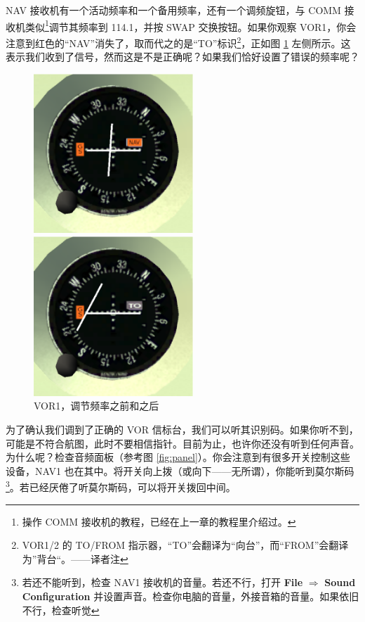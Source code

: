 NAV 接收机有一个活动频率和一个备用频率，还有一个调频旋钮，与 COMM 接收机类似\footnote{操作 COMM 接收机的教程，已经在上一章的教程里介绍过。}调节其频率到 114.1，并按 SWAP 交换按钮。如果你观察 VOR1，你会注意到红色的“NAV”消失了，取而代之的是“TO”标识\footnote{VOR1/2 的 TO/FROM 指示器，“TO”会翻译为“向台”，而“FROM”会翻译为”背台“。——译者注}，正如图 \ref{fig:VOR1} 左侧所示。这表示我们收到了信号，然而这是不是正确呢？如果我们恰好设置了错误的频率呢？

\begin{figure}
  \begin{minipage}[b]{0.5\linewidth}
    \includegraphics[width=6cm]{img/VOR1_before}
  \end{minipage}
  \hspace{0.5cm}
  \begin{minipage}[b]{0.5\linewidth}
    \includegraphics[width=6cm]{img/VOR1_after}
  \end{minipage}
  \caption{VOR1，调节频率之前和之后}
  \label{fig:VOR1}
\end{figure}

为了确认我们调到了正确的 VOR 信标台，我们可以听其识别码。如果你听不到，可能是不符合航图，此时不要相信指针。目前为止，也许你还没有听到任何声音。为什么呢？检查音频面板（参考图 \ref{fig:panel}）。你会注意到有很多开关控制这些设备，NAV1 也在其中。将开关向上拨（或向下——无所谓），你能听到莫尔斯码 \mdot\mdot\mdot\mspace
\mdot\mdash\mdash\mdash\mspace \mdash\mdot\mdash\mdot\footnote{若还不能听到，检查 NAV1 接收机的音量。若还不行，打开 \textbf{\textsf{File}} $\Rightarrow$ \textbf{\textsf{Sound Configuration}} 并设置声音。检查你电脑的音量，外接音箱的音量。如果依旧不行，检查听觉}。若已经厌倦了听莫尔斯码，可以将开关拨回中间。

